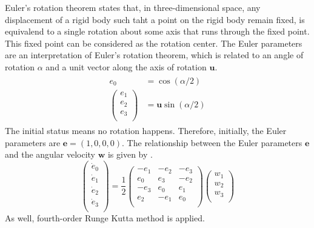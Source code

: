 Euler's rotation theorem states that, in three-dimensional space, any 
displacement of a rigid body such taht a point on the rigid body remain 
fixed, is equivalend to a single rotation about some axis that runs 
through the fixed point. 
This fixed point can be considered as the rotation center. 
The Euler parameters are an interpretation of Euler's rotation theorem, which
is related to an angle of rotation $\alpha$ and a unit vector along the axis 
of rotation $\mathbf{u}$. 
\begin{eqnarray}
\begin{aligned}
e_0 &= \cos(\alpha / 2) \\
\left(
\begin{array}{c}
e_1 \\ e_2 \\ e_3 \\
\end{array}
\right) &= \mathbf{u} \sin(\alpha / 2)
\end{aligned}
\label{eqn:Euler_parameters}
\end{eqnarray}
The initial status means no rotation happens.
Therefore, initially, the Euler parameters are $\mathbf{e} = (1, 0, 0, 0)$.
The relationship between the Euler parameters $\mathbf{e}$ and the angular
velocity $\mathbf{w}$ is given by
. 
\begin{equation}
\left(
\begin{array}{c}
\dot{e}_0 \\ \dot{e}_1 \\ \dot{e}_2 \\ \dot{e}_3 \\
\end{array}
\right) = \frac{1}{2}
\left(
\begin{array}{ccc}
-e_1 & -e_2 & -e_3 \\
e_0 & e_3 & -e_2 \\
-e_3 & e_0 & e_1 \\
e_2 & -e_1 & e_0 \\
\end{array}
\right)
\left(
\begin{array}{c}
w_1 \\ w_2 \\ w_3 \\
\end{array}
\right)
\label{eqn:euler_parameters_and_angular_velocity}
\end{equation}
As well, fourth-order Runge Kutta method  is applied.

